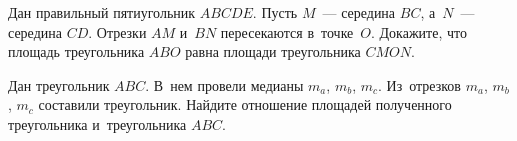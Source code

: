 \begin{problems}
\item
Дан правильный пятиугольник $ABCDE$.
Пусть $M$~--- середина $BC$, а~$N$~--- середина $CD$.
Отрезки $AM$ и~$BN$ пересекаются в~точке~$O$.
Докажите, что площадь треугольника $ABO$ равна площади треугольника $CMON$.

\item
Дан треугольник $ABC$.
В~нем провели медианы $m_{a}$, $m_{b}$, $m_{c}$.
Из~отрезков $m_{a}$, $m_{b}$, $m_{c}$ составили треугольник.
Найдите отношение площадей полученного треугольника и~треугольника $ABC$.

\end{problems}

